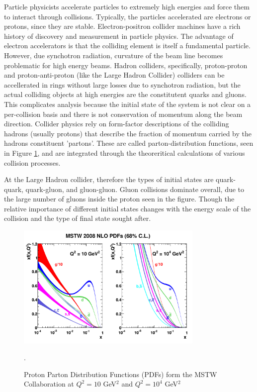 Particle physicists accelerate particles to extremely high energies and force
them to interact through collisions. Typically, the particles accelerated are
electrons or protons, since they are stable. Electron-positron collider
machines have a rich history of discovery and measurement in particle physics.
The advantage of electron accelerators is that the colliding element is itself
a fundamental particle. However, due synchotron radiation, curvature of the
beam line becomes problematic for high energy beams.  Hadron colliders,
specifically, proton-proton and proton-anti-proton (like the Large Hadron
    Collider) colliders can be accellerated in rings without large losses
due to synchotron radiation, but the actual colliding objects at high
energies are the constitutent quarks and gluons. This complicates analysis
because the initial state of the system is not clear on a per-collision
basis and there is not conservation of momentum along the beam direction.
Collider physics rely on form-factor descriptions of the colliding hadrons
(usually protons) that describe the fraction of momentum carried by the
hadrons constituent 'partons'.  These are called parton-distribution
functions, seen in Figure \ref{figure:theory_pdf}, and are integrated
through the theoreritical calculations of various collision processes.

At the Large Hadron collider, therefore the types of initial states are
quark-quark, quark-gluon, and gluon-gluon. Gluon collisions dominate overall,
  due to the large number of gluons inside the proton seen in the figure.
  Though the relative importance of different initial states changes with the
  energy scale of the collision and the type of final state sought after.  

\begin{figure}[!t]
\centering 
\includegraphics[width=0.8\textwidth]{figs/mstw2008nlo68cl_allpdfs.pdf}
\caption {Proton Parton Distribution Functions (PDFs) form the MSTW Collaboration at $Q^2 = 10$ GeV$^2$ and $Q^2 = 10^4$ GeV$^2$}.
\label{figure:theory_pdf}
\end{figure}

